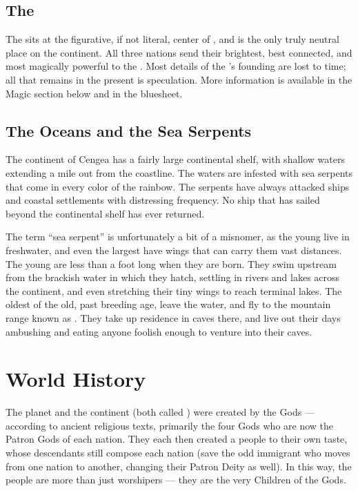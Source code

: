 \documentclass[blue]{GL2020}
\begin{document}
\subsection*{The \pSchool{}}
The \pSchool{} sits at the figurative, if not literal, center of \pEarth{}, and is the only truly neutral place on the continent. All three nations send their brightest, best connected, and most magically powerful to the \pSc{}. Most details of the \pSc{}’s founding are lost to time; all that remains in the present is speculation. More information is available in the Magic section below and in the \pSchool{} bluesheet. 

\subsection*{The Oceans and the Sea Serpents}
The continent of Cengea has a fairly large continental shelf, with shallow waters extending a mile out from the coastline. The waters are infested with sea serpents that come in every color of the rainbow. The serpents have always attacked ships and coastal settlements with distressing frequency. No ship that has sailed beyond the continental shelf has ever returned.

The term ``sea serpent'' is unfortunately a bit of a misnomer, as the young live in freshwater, and even the largest have wings that can carry them vast distances. The young are less than a foot long when they are born. They swim upstream from the brackish water in which they hatch, settling in rivers and lakes across the continent, and even stretching their tiny wings to reach terminal lakes. The oldest of the old, past breeding age, leave the water, and fly to the mountain range known as \pSpine{}. They take up residence in caves there, and live out their days ambushing and eating anyone foolish enough to venture into their caves.

\section*{World History}
The planet and the continent (both called \pEarth{}) were created by the Gods — according to ancient religious texts, primarily the four Gods who are now the Patron Gods of each nation. They each then created a people to their own taste, whose descendants still compose each nation (save the odd immigrant who moves from one nation to another, changing their Patron Deity as well). In this way, the people are more than just worshipers — they are the very Children of the Gods.
\end{document}
